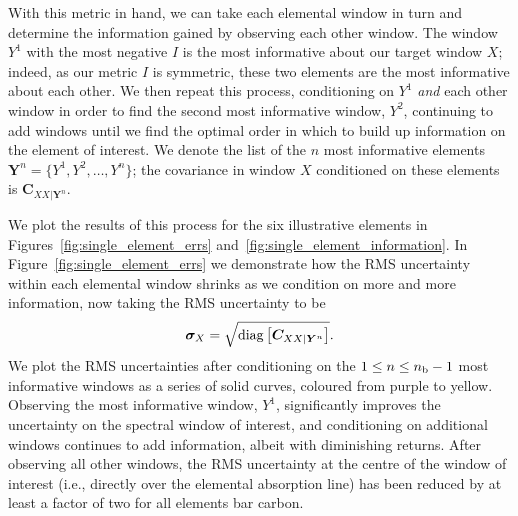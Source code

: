 \documentclass[a4paper,fleqn,usenatbib]{mnras}
\newcommand{\nb}{n_{\rm b}}
\newcommand{\condcov}{{\bm C}}
\begin{document}
With this metric in hand, we can take each elemental window in turn and determine the information gained by observing each other window. The window $Y^1$ with the most negative $I$ is the most informative about our target window $X$; indeed, as our metric $I$ is symmetric, these two elements are the most informative about each other. We then repeat this process, conditioning on $Y^1$ {\it and} each other window in order to find the second most informative window, $Y^2$, continuing to add windows until we find the optimal order in which to build up information on the element of interest. We denote the list of the $n$ most informative elements $\bm{Y}^n = \{ Y^1, Y^2, \ldots, Y^n \}$; the covariance in window $X$ conditioned on these elements is $\condcov_{XX|\bm{Y}^n}$.

We plot the results of this process for the six illustrative elements in Figures~\ref{fig:single_element_errs} and~\ref{fig:single_element_information}. In Figure~\ref{fig:single_element_errs} we demonstrate how the RMS uncertainty within each elemental window shrinks as we condition on more and more information, now taking the RMS uncertainty to be
\begin{equation}
\bm{\sigma}_X = \sqrt{{\rm diag} \left[\condcov_{XX|\bm{Y}^n}\right]}.
\end{equation}
We plot the RMS uncertainties after conditioning on the $1 \le n \le \nb-1$ most informative windows as a series of solid curves, coloured from purple to yellow. Observing the most informative window, $Y^1$, significantly improves the uncertainty on the spectral window of interest, and conditioning on additional windows continues to add information, albeit with diminishing returns. After observing all other windows, the RMS uncertainty at the centre of the window of interest (i.e., directly over the elemental absorption line) has been reduced by at least a factor of two for all elements bar carbon.
\end{document}
